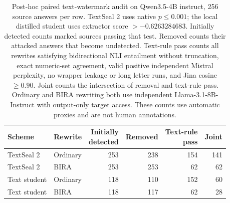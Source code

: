 \begin{table}[ht]\centering\small
\begin{tabular}{llrrrr}\toprule
Scheme & Rewrite & \shortstack{Initially\\detected} & Removed & \shortstack{Text-rule\\pass} & Joint\\\midrule
TextSeal 2 & Ordinary & 253 & 238 & 154 & 141 \\
TextSeal 2 & BIRA & 253 & 253 & 62 & 62 \\
Text student & Ordinary & 118 & 110 & 152 & 60 \\
Text student & BIRA & 118 & 117 & 62 & 28 \\
\bottomrule\end{tabular}
\caption{Post-hoc paired text-watermark audit on Qwen3.5-4B instruct, 256 source answers per row. TextSeal 2 uses native $p\leq0.001$; the local distilled student uses extractor score $>-0.6263284683$. Initially detected counts marked sources passing that test. Removed counts their attacked answers that become undetected. Text-rule pass counts all rewrites satisfying bidirectional NLI entailment without truncation, exact numeric-set agreement, valid positive independent Mistral perplexity, no wrapper leakage or long letter runs, and Jina cosine $\geq0.90$. Joint counts the intersection of removal and text-rule pass. Ordinary and BIRA rewriting both use independent Llama-3.1-8B-Instruct with output-only target access. These counts use automatic proxies and are not human annotations.}\end{table}
